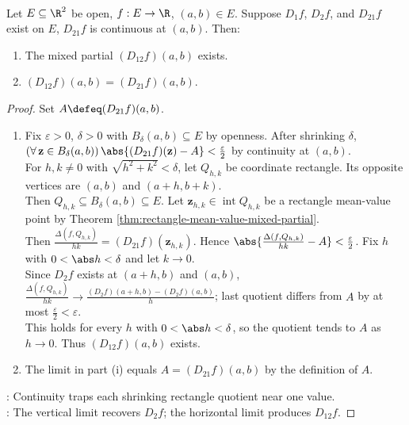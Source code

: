 \begin{theorem} \label{thm:equality-of-mixed-partials} \\
Let $E\subseteq\R^2$ be open, $f:E\to\R$, $(a,b)\in E$. Suppose $D_1f$, $D_2f$, and $D_{21}f$ exist on $E$, $D_{21}f$ is continuous at $(a,b)$. Then:
\begin{enumerate}[label=(\roman*)]
\setlength{\itemsep}{0pt}
\item The mixed partial $(D_{12}f)(a,b)$ exists.
\item $(D_{12}f)(a,b)=(D_{21}f)(a,b)$.
\end{enumerate}
\begin{proof}
Set $A\defeq(D_{21}f)(a,b)$.
\begin{enumerate}[label=(\roman*)]
\setlength{\itemsep}{0pt}
\item Fix $\varepsilon>0$, $\delta>0$ with $B_\delta(a,b)\subseteq E$ by openness. After shrinking $\delta$, $(\forall\,\mathbf z\in B_\delta(a,b))\,\abs{(D_{21}f)(\mathbf z)-A}<\frac{\varepsilon}{2}$ by continuity at $(a,b)$.\\
For $h,k\neq0$ with $\sqrt{h^2+k^2}<\delta$, let $Q_{h,k}$ be coordinate rectangle. Its opposite vertices are $(a,b)$ and $(a+h,b+k)$.\\
Then $Q_{h,k}\subseteq B_\delta(a,b)\subseteq E$. Let $\mathbf z_{h,k}\in\operatorname{int}Q_{h,k}$ be a rectangle mean-value point by Theorem \ref{thm:rectangle-mean-value-mixed-partial}.\\
Then $\frac{\Delta(f,Q_{h,k})}{hk}=(D_{21}f)(\mathbf z_{h,k})$. Hence $\abs{\frac{\Delta(f,Q_{h,k})}{hk}-A}<\frac{\varepsilon}{2}$. Fix $h$ with $0<\abs h<\delta$ and let $k\to0$.\\
Since $D_2f$ exists at $(a+h,b)$ and $(a,b)$, $\frac{\Delta(f,Q_{h,k})}{hk}\to \frac{(D_2f)(a+h,b)-(D_2f)(a,b)}{h}$; last quotient differs from $A$ by at most $\frac{\varepsilon}{2}<\varepsilon$.\\
This holds for every $h$ with $0<\abs h<\delta$, so the quotient tends to $A$ as $h\to0$. Thus $(D_{12}f)(a,b)$ exists.
\item The limit in part (i) equals $A=(D_{21}f)(a,b)$ by the definition of $A$.
\end{enumerate}
: Continuity traps each shrinking rectangle quotient near one value.\\
: The vertical limit recovers $D_2f$; the horizontal limit produces $D_{12}f$.
\end{proof}
\end{theorem}


